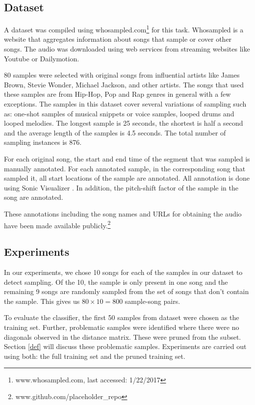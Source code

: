 \documentclass{article}
\begin{document}
\subsection{Dataset}
A dataset was compiled using whosampled.com\footnote{www.whosampled.com, last accessed: 1/22/2017} for this task. Whosampled is a website that aggregates information about songs that sample or cover other songs. The audio was downloaded using web services from streaming websites like Youtube or Dailymotion.

80 samples were selected with original songs from influential artists like James Brown, Stevie Wonder, Michael Jackson, and other artists. The songs that used these samples are from Hip-Hop, Pop and Rap genres in general with a few exceptions. The samples in this dataset cover several variations of sampling such as: one-shot samples of musical snippets or voice samples, looped drums and looped melodies. The longest sample is 25 seconds, the shortest is half a second and the average length of the samples is 4.5 seconds. The total number of sampling instances is 876.

For each original song, the start and end time of the segment that was sampled is manually annotated. For each annotated sample, in the corresponding song that sampled it, all start locations of the sample are annotated. All annotation is done using Sonic Visualizer \cite{SonicVisualiser}. In addition, the pitch-shift factor of the sample in the song are annotated.

These annotations including the song names and URLs for obtaining the audio have been made available publicly.\footnote{www.github.com/placeholder\_repo}

\subsection{Experiments}

In our experiments, we chose 10 songs for each of the samples in our dataset to detect sampling. Of the 10, the sample is only present in one song and the remaining 9 songs are randomly sampled from the set of songs that don't contain the sample. This gives us $80\times10 = 800$ sample-song pairs.

To evaluate the classifier, the first 50 samples from dataset were chosen as the training set. Further, problematic samples were identified where there were no diagonals observed in the distance matrix. These were pruned from the subset. Section \ref{def} will discuss these problematic samples. Experiments are carried out using both: the full training set and the pruned training set.
\end{document}
